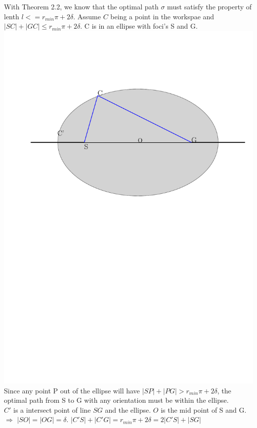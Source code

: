 \documentclass[12pt]{article}
\begin{document}
  With Theorem 2.2, we know that the optimal path $\sigma$ must satisfy the property of lenth $l <= r_{min}\pi + 2\delta$. Assume $C$ being a point in the workspae and $|SC|+|GC| \leq r_{min}\pi + 2\delta$. C is in an ellipse with foci's S and G. \\ 
  
  \includegraphics[scale=0.7]{Ellipse}\\
  
  Since any point P out of the ellipse will have $|SP| + |PG| > r_{min}\pi + 2\delta$, the optimal path from S to G with any orientation must be within the ellipse.\\
  
  $C'$ is a intersect point of line $SG$ and the ellipse. $O$ is the mid point of S and G. \\
  
  $\Longrightarrow$ $|SO| = |OG| = \delta$. $|C'S| + |C'G| = r_{min}\pi + 2\delta = 2|C'S| + |SG|$
  
\end{document}
